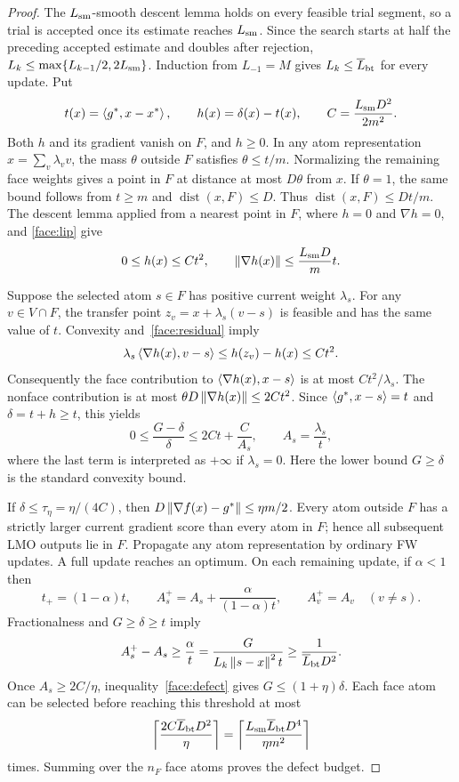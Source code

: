 \begin{proof}
The $L_{\rm sm}$-smooth descent lemma holds on every feasible trial
segment, so a trial is accepted once its estimate reaches
$L_{\rm sm}$. Since the search starts at half the preceding accepted
estimate and doubles after rejection,
$L_k\le\max\{L_{k-1}/2,2L_{\rm sm}\}$. Induction from
$L_{-1}=M$ gives $L_k\le\overline L_{\rm bt}$ for every update.
Put
\[
 t(x)=\left\langle g^*,x-x^*\right\rangle,\qquad h(x)=\delta(x)-t(x),\qquad
 C=\frac{L_{\rm sm}D^2}{2m^2}.
\]
Both $h$ and its gradient vanish on $F$, and $h\ge0$. In any atom
representation $x=\sum_v\lambda_vv$, the mass $\theta$ outside $F$
satisfies $\theta\le t/m$. Normalizing the remaining face weights
gives a point in $F$ at distance at most $D\theta$ from $x$. If
$\theta=1$, the same bound follows from $t\ge m$ and
$\operatorname{dist}(x,F)\le D$. Thus
$\operatorname{dist}(x,F)\le Dt/m$. The descent lemma applied from a
nearest point in $F$, where $h=0$ and $\nabla h=0$, and
\eqref{face:lip} give
\begin{equation}\label{face:residual}
 0\le h(x)\le Ct^2,\qquad
 \left\|\nabla h(x)\right\|\le\frac{L_{\rm sm}D}{m}t.
\end{equation}

Suppose the selected atom $s\in F$ has positive current weight
$\lambda_s$. For any $v\in V\cap F$, the transfer point
$z_v=x+\lambda_s(v-s)$ is feasible and has the same value of $t$.
Convexity and~\eqref{face:residual} imply
\[
 \lambda_s\left\langle\nabla h(x),v-s\right\rangle
 \le h(z_v)-h(x)\le Ct^2.
\]
Consequently the face contribution to
$\left\langle\nabla h(x),x-s\right\rangle$ is at most $Ct^2/\lambda_s$.
The nonface contribution is at most
$\theta D\left\|\nabla h(x)\right\|\le 2Ct^2$. Since
$\left\langle g^*,x-s\right\rangle=t$ and $\delta=t+h\ge t$, this yields
\begin{equation}\label{face:defect}
 0\le\frac{G-\delta}{\delta}
 \le 2Ct+\frac{C}{A_s},\qquad A_s=\frac{\lambda_s}{t},
\end{equation}
where the last term is interpreted as $+\infty$ if $\lambda_s=0$.
Here the lower bound $G\ge\delta$ is the standard convexity bound.

If $\delta\le\tau_\eta=\eta/(4C)$, then
$D\left\|\nabla f(x)-g^*\right\|\le\eta m/2$. Every atom outside $F$ has a
strictly larger current gradient score than every atom in $F$; hence
all subsequent LMO outputs lie in $F$. Propagate any atom representation
by ordinary FW updates. A full update reaches an optimum. On each
remaining update, if $\alpha<1$ then
\[
 t_+=(1-\alpha)t,\qquad
 A_s^+=A_s+\frac{\alpha}{(1-\alpha)t},\qquad
 A_v^+=A_v\quad(v\ne s).
\]
Fractionalness and $G\ge\delta\ge t$ imply
\[
 A_s^+-A_s\ge\frac{\alpha}{t}
 =\frac{G}{L_k\left\|s-x\right\|^2t}
 \ge\frac{1}{\overline L_{\rm bt}D^2}.
\]
Once $A_s\ge2C/\eta$, inequality~\eqref{face:defect} gives
$G\le(1+\eta)\delta$. Each face atom can be selected before reaching
this threshold at most
\[
 \left\lceil\frac{2C\overline L_{\rm bt}D^2}{\eta}\right\rceil
 =\left\lceil\frac{L_{\rm sm}\overline L_{\rm bt}D^4}
                 {\eta m^2}\right\rceil
\]
times. Summing over the $n_F$ face atoms proves the defect budget.


\end{proof}
